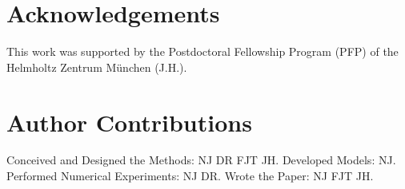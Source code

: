 \documentclass[10pt,letterpaper]{article}
\begin{document}
%
%
%
%

\section*{Acknowledgements}


This work was supported by the Postdoctoral Fellowship Program (PFP) of the Helmholtz Zentrum M\"unchen (J.H.).

\section*{Author Contributions}

Conceived and Designed the Methods: NJ DR FJT JH.
Developed Models: NJ.
Performed Numerical Experiments: NJ DR.
Wrote the Paper: NJ FJT JH.

\nolinenumbers


\end{document}
